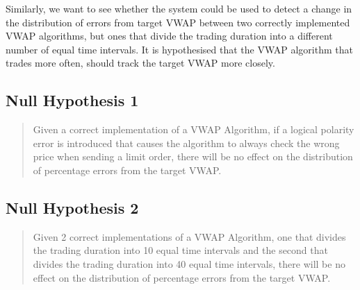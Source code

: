 Similarly, we want to see whether the system could be used to detect a change in the distribution of errors from target VWAP between two correctly implemented VWAP algorithms, but ones that divide the trading duration into a different number of equal time intervals. It is hypothesised that the VWAP algorithm that trades more often, should track the target VWAP more closely.

\subsection{Null Hypothesis 1}
\label{Chapters/Introduction/Null-Hypothesis-1}
\begin{quote}
Given a correct implementation of a VWAP Algorithm, if a logical polarity error is introduced that causes the algorithm to always check the wrong price when sending a limit order, there will be no effect on the distribution of percentage errors from the target VWAP.
\end{quote}

\subsection{Null Hypothesis 2}
\label{Chapters/Introduction/Null-Hypothesis-2}
\begin{quote}
Given 2 correct implementations of a VWAP Algorithm, one that divides the trading duration into 10 equal time intervals and the second that divides the trading duration into 40 equal time intervals, there will be no effect on the distribution of percentage errors from the target VWAP.
\end{quote}





